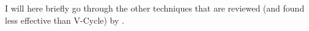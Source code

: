 I will here briefly go through the other techniques that are reviewed (and found less effective than V-Cycle) by \cite{lee14}.